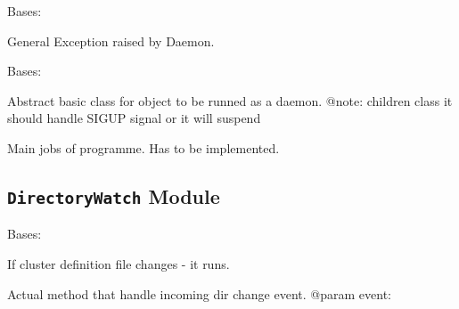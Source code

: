 \documentclass[letterpaper,10pt,english]{sphinxmanual}
\begin{document}

\begin{fulllineitems}
\label{ref-manual/XrdTest:XrdTest.Daemon.DaemonException}
Bases: 

General Exception raised by Daemon.

\end{fulllineitems}


\begin{fulllineitems}
\label{ref-manual/XrdTest:XrdTest.Daemon.Runnable}
Bases: 

Abstract basic class for object to be runned as a daemon.
@note: children class it should handle SIGUP signal or it will suspend

\begin{fulllineitems}
\label{ref-manual/XrdTest:XrdTest.Daemon.Runnable.run}
Main jobs of programme. Has to be implemented.

\end{fulllineitems}


\end{fulllineitems}



\subsection{\texttt{DirectoryWatch} Module}
\label{ref-manual/XrdTest:directorywatch-module}\label{ref-manual/XrdTest:module-XrdTest.DirectoryWatch}

\begin{fulllineitems}
\label{ref-manual/XrdTest:XrdTest.DirectoryWatch.ClustersDefinitionsChangeHandler}
Bases: 

If cluster definition file changes - it runs.

\begin{fulllineitems}
\label{ref-manual/XrdTest:XrdTest.DirectoryWatch.ClustersDefinitionsChangeHandler.process_default}
Actual method that handle incoming dir change event.
@param event:

\end{fulllineitems}


\end{fulllineitems}
\end{document}
